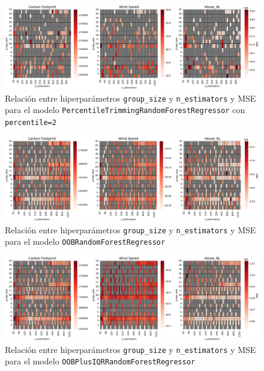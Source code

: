 \begin{figure}[h]
\centering
    \includegraphics[width=1\textwidth]{figures/marco-metodologico/heatmaps/heatmap_pt_2.png}
\caption{Relación entre hiperparámetros \texttt{group\_size} y \texttt{n\_estimators} y MSE para el modelo \texttt{PercentileTrimmingRandomForestRegressor} con \texttt{percentile=2}}
\end{figure}
\label{figure5}

\begin{figure}[h]
\centering
    \includegraphics[width=1\textwidth]{figures/marco-metodologico/heatmaps/heatmap_oob.png}
\caption{Relación entre hiperparámetros \texttt{group\_size} y \texttt{n\_estimators} y MSE para el modelo \texttt{OOBRandomForestRegressor}}
\end{figure}
\label{figure6}

\begin{figure}[h]
\centering
    \includegraphics[width=1\textwidth]{figures/marco-metodologico/heatmaps/heatmap_oob_plus_iqr.png}
\caption{Relación entre hiperparámetros \texttt{group\_size} y \texttt{n\_estimators} y MSE para el modelo \texttt{OOBPlusIQRRandomForestRegressor}}
\end{figure}
\label{figure7}

